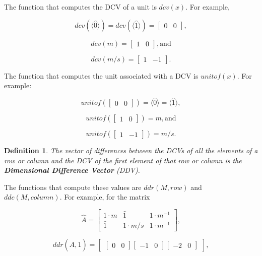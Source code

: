 \documentclass[10pt,letterpaper]{article}
\newtheorem{defn}{Definition}[section]
\numberwithin{equation}{section}
\begin{document}
The function that computes the DCV of a unit is $dcv(x)$.  For
example,

\[ dcv(\langle\hat 0 \rangle) = dcv(\langle\hat 1 \rangle) = \left[ \begin{matrix} 0 & 0 \end{matrix} \right] , \]

\[ dcv(m) = \left[ \begin{matrix} 1 & 0 \end{matrix} \right] , \mbox{and} \]

\[ dcv(m/s) = \left[ \begin{matrix} 1 & -1 \end{matrix} \right] . \]

The function that computes the unit associated with a DCV is
$unitof(x)$.  For example:

\[  unitof(\left[ \begin{matrix} 0 & 0 \end{matrix} \right]) = \langle\hat 0 \rangle = \langle\hat 1 \rangle , \]

\[ unitof(\left[ \begin{matrix} 1 & 0 \end{matrix} \right]) = m, \mbox{and} \]

\[ unitof(\left[ \begin{matrix} 1 & -1 \end{matrix} \right]) = m/s. \]

\begin{defn}The vector of differences between the DCVs of all the
  elements of a row or column and the DCV of the first element of that
  row or column is the \textbf{Dimensional Difference Vector}
  (DDV).\end{defn}

The functions that compute these values are $ddr(M, row)$ and $ddc(M,
column)$.  For example, for the matrix

\[ \hat A = \left[ \begin{matrix} 
  1 \cdot m & \hat 1 & 1 \cdot m^{-1} \\
  \hat 1 & 1 \cdot m/s & 1 \cdot m^{-1}
 \end{matrix} \right] , \]

\[ ddr(\hat A, 1) = \left[ \begin{matrix} \left[ \begin{matrix} 0 & 0 \end{matrix} \right] \left[ \begin{matrix} -1 & 0 \end{matrix} \right] \left[ \begin{matrix} -2 & 0 \end{matrix} \right] \end{matrix} \right] , \]
\end{document}

